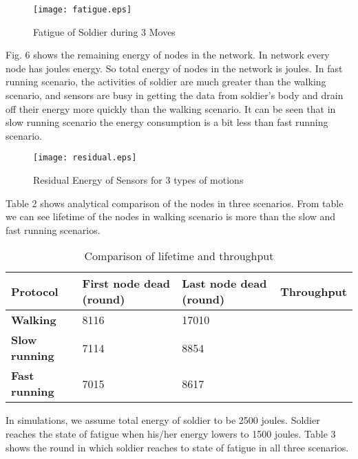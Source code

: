 \documentclass[journal]{IEEEtran}
\begin{document}
 \begin{figure} [!ht]
 \centering
 \texttt{[image: fatigue.eps]}
 \vspace{-1cm}
 \caption{Fatigue of Soldier during 3 Moves}
  \end{figure}

  Fig. 6 shows the remaining energy of nodes in the network. In network every node has  joules energy. So total energy of nodes in the network is  joules.
   In fast running scenario, the activities of soldier are much greater than the walking scenario, and sensors are busy in getting the data from soldier's body and
   drain off their energy more quickly than the walking scenario. It can be seen that in slow running scenario the energy consumption is a bit less than fast
   running scenario.
  \begin{figure} [!ht]
 \centering
 \texttt{[image: residual.eps]}
 \caption{Residual Energy of Sensors for 3 types of motions}
  \end{figure}

 Table 2 shows analytical comparison of the nodes in three scenarios. From table we can see lifetime of the nodes in walking scenario is more than the slow and
  fast running scenarios.
  \begin{table}[!ht]
\begin{center}
\caption{Comparison of lifetime and throughput}
 \begin{tabular}{|p{1.5cm}|p{2cm}|p{2cm}|p{2cm}|}\hline
   \textbf{Protocol}           & \textbf{First node dead (round)} & \textbf{Last node dead (round)}  & \textbf{Throughput} \\ \hline \hline
    \textbf{Walking }          &  8116                         & 17010                            & \\ \hline
     \textbf{Slow running}     &  7114                         & 8854                             & \\ \hline
      \textbf{Fast running}    &  7015                         & 8617                             &\\ \hline
\end{tabular}
\end{center}
\end{table}

In simulations, we assume total energy of soldier to be 2500 joules. Soldier reaches the state of fatigue when his/her energy lowers to 1500 joules. Table 3
shows the round in which soldier reaches to state of fatigue in all three scenarios.
\end{document}
